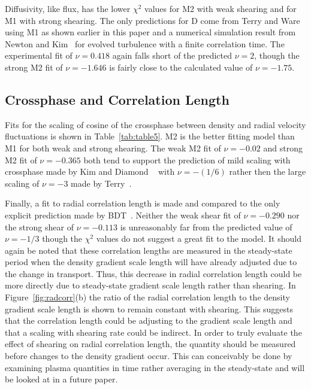 \documentclass[aip,pop,amsmath,amssymb,preprint,superscriptaddress]{revtex4-1} %
\begin{document}
Diffusivity, like flux, has the lower $\chi^{2}$ values for M2 with weak shearing and for M1 with strong shearing. The only predictions for D come from Terry and Ware using M1 as shown earlier in this paper and a numerical simulation result from Newton and Kim~\cite{newton11} for evolved turbulence with a finite correlation time. The experimental fit of $\nu = 0.418$ again falls short of the predicted $\nu = 2$, though the strong M2 fit of $\nu = -1.646$ is fairly close to the calculated value of $\nu = -1.75$.


\subsection{Crossphase and Correlation Length}

Fits for the scaling of cosine of the crossphase between density and radial velocity fluctuations is shown in Table~\ref{tab:table5}. M2 is the better fitting model than M1 for both weak and strong shearing. The weak M2 fit of $\nu = -0.02$ and strong M2 fit of $\nu = -0.365$ both tend to support the prediction of mild scaling with crossphase made by Kim and Diamond ~\cite{kim03,kim04} with $\nu = -(1/6)$ rather then the large scaling of $\nu = -3$ made by Terry~\cite{terry01}. 

Finally, a fit to radial correlation length is made and compared to the only explicit prediction made by BDT~\cite{biglari90}. Neither the weak shear fit of $\nu = -0.290$ nor the strong shear of $\nu = -0.113$ is unreasonably far from the predicted value of $\nu = -1/3$ though the $\chi^{2}$ values do not suggest a great fit to the model.  It should again be noted that these correlation lengths are measured in the steady-state period when the density gradient scale length will have already adjusted due to the change in transport. Thus, this decrease in radial correlation length could be more directly due to steady-state gradient scale length rather than shearing.  In Figure~\ref{fig:radcorr}(b) the ratio of the radial correlation length to the density gradient scale length is shown to remain constant with shearing. This suggests that the correlation length could be adjusting to the gradient scale length and that a scaling with shearing rate could be indirect. In order to truly evaluate the effect of shearing on radial correlation length, the quantity should be measured before changes to the density gradient occur. This can conceivably be done by examining plasma quantities in time rather averaging in the steady-state and will be looked at in a future paper.
\end{document}
